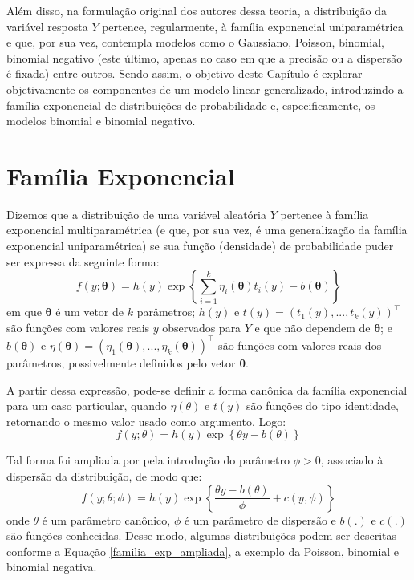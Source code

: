 \documentclass[12pt, a4paper, twoside]{report}
\numberwithin{equation}{section} %
\begin{document}
Além disso, na formulação original dos autores dessa teoria, a distribuição da variável resposta $Y$ pertence, regularmente, à família exponencial uniparamétrica e que, por sua vez, contempla modelos como o Gaussiano, Poisson, binomial, binomial negativo (este último, apenas no caso em que a precisão ou a dispersão é fixada) entre outros. Sendo assim, o objetivo deste Capítulo é explorar objetivamente os componentes de um modelo linear generalizado, introduzindo a família exponencial de distribuições de probabilidade e, especificamente, os modelos binomial e binomial negativo.

\section{Família Exponencial}
Dizemos que a distribuição de uma variável aleatória $Y$ pertence à família exponencial multiparamétrica (e que, por sua vez, é uma generalização da família exponencial uniparamétrica) se sua função (densidade) de probabilidade puder ser expressa da seguinte forma: 
\begin{equation}
    f(y;\boldsymbol{\theta}) = h(y) \exp \left\{ \sum_{i=1}^k\eta_{i}(\boldsymbol{\theta})t_{i}(y)-b(\boldsymbol{\theta}) \right\}
\end{equation}
em que $\boldsymbol{\theta}$ é um vetor de $k$ parâmetros; $h(y)$ e $t(y)=(t_{1}(y),...,t_{k}(y))^\top$ são funções com valores reais $y$ observados para $Y$ e que não dependem de $\boldsymbol{\theta}$; e $b(\boldsymbol{\theta})$ e $\eta(\boldsymbol{\theta})=(\eta_{1}(\boldsymbol{\theta}),...,\eta_{k}(\boldsymbol{\theta}))^\top$ são funções com valores reais dos parâmetros, possivelmente definidos pelo vetor $\boldsymbol{\theta}$.

A partir dessa expressão, pode-se definir a forma canônica da família exponencial para um caso particular, quando $\eta(\theta)$ e $t(y)$ são funções do tipo identidade, retornando o mesmo valor usado como argumento. Logo: 
\begin{equation}
    f(y;\theta) = h(y) \exp \left\{\theta y - b(\theta) \right\}
\end{equation}

Tal forma foi ampliada por \cite{nelder1972generalized} pela introdução do parâmetro $\phi > 0$, associado à dispersão da distribuição, de modo que:
\begin{equation}
    f(y;\theta;\phi) = h(y) \exp \left\{\frac{\theta y - b(\theta)}{\phi} + c(y,\phi) \right\}
    \label{familia_exp_ampliada}
\end{equation}
onde $\theta$ é um parâmetro canônico, $\phi$ é um parâmetro de dispersão e $b(.)$ e $c(.)$ são funções conhecidas. Desse modo, algumas distribuições podem ser descritas conforme a Equação \ref{familia_exp_ampliada}, a exemplo da Poisson, binomial e binomial negativa.
\end{document}
